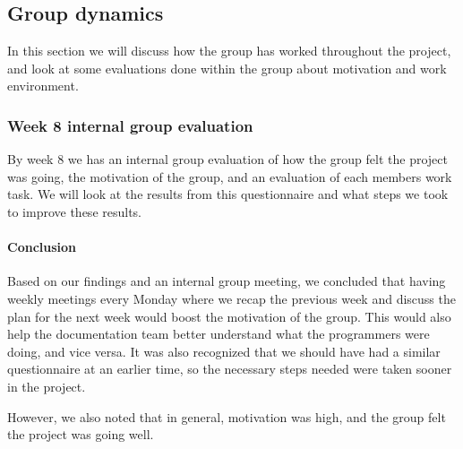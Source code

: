 \subsection{Group dynamics}
In this section we will discuss how the group has worked throughout the project, and look at some evaluations done within the group about motivation and work environment. 

\subsubsection{Week 8 internal group evaluation}
By week 8 we has an internal group evaluation of how the group felt the project was going, the motivation of the group, and an evaluation of each members work task. We will look at the results from this questionnaire and what steps we took to improve these results.



\paragraph{Conclusion}
Based on our findings and an internal group meeting, we concluded that having weekly meetings every Monday where we recap the previous week and discuss the plan for the next week would boost the motivation of the group. This would also help the documentation team better understand what the programmers were doing, and vice versa. It was also recognized that we should have had a similar questionnaire at an earlier time, so the necessary steps needed were taken sooner in the project.

However, we also noted that in general, motivation was high, and the group felt the project was going well.
